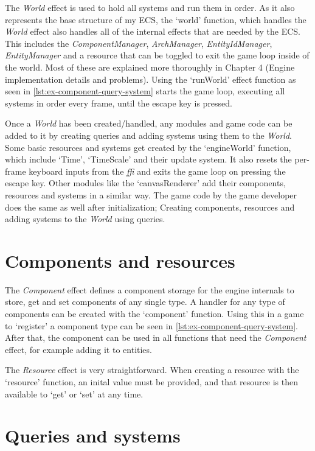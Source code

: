 The \textit{World} effect is used to hold all systems and run them in order. As it also represents the base structure of my ECS, the `world' function, which handles the \textit{World} effect also handles all of the internal effects that are needed by the ECS. This includes the \textit{ComponentManager}, \textit{ArchManager}, \textit{EntityIdManager}, \textit{EntityManager} and a resource that can be toggled to exit the game loop inside of the world. Most of these are explained more thoroughly in Chapter 4 (Engine implementation details and problems). Using the `runWorld' effect function as seen in \cref{lst:ex-component-query-system} starts the game loop, executing all systems in order every frame, until the escape key is pressed.

Once a \textit{World} has been created/handled, any modules and game code can be added to it by creating queries and adding systems using them to the \textit{World}. Some basic resources and systems get created by the `engineWorld' function, which include `Time', `TimeScale' and their update system. It also resets the per-frame keyboard inputs from the \textit{ffi} and exits the game loop on pressing the escape key. Other modules like the `canvasRenderer' add their components, resources and systems in a similar way. The game code by the game developer does the same as well after initialization; Creating components, resources and adding systems to the \textit{World} using queries.

\section{Components and resources}

The \textit{Component} effect defines a component storage for the engine internals to store, get and set components of any single type. A handler for any type of components can be created with the `component' function. Using this in a game to `register' a component type can be seen in \cref{lst:ex-component-query-system}. After that, the component can be used in all functions that need the \textit{Component} effect, for example adding it to entities.

The \textit{Resource} effect is very straightforward. When creating a resource with the `resource' function, an inital value must be provided, and that resource is then available to `get' or `set' at any time.

\section{Queries and systems}

